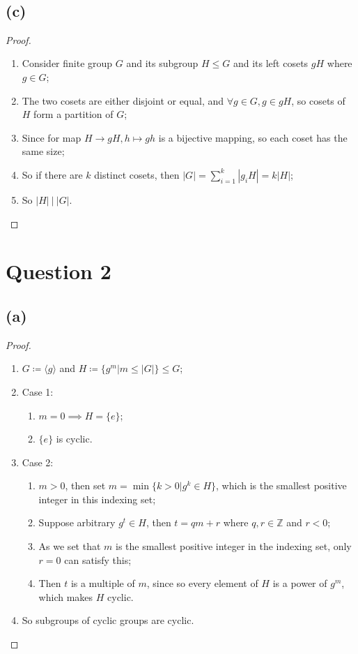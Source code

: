 \documentclass{article}
\begin{document}
~

\subsection*{(c)}

\begin{proof}
    ~
    \begin{enumerate}
        \item Consider finite group $G$ and its subgroup $H\leq G$ and its left cosets $gH$ where $g\in G$;
        \item The two cosets are either disjoint or equal, and $\forall g\in G, g\in gH$, so cosets of $H$ form a partition of $G$;
        \item Since for map $H\to gH,h\mapsto gh$ is a bijective mapping, so each coset has the same size;
        \item So if there are $k$ distinct cosets, then $|G|=\sum_{i=1}^{k}|g_iH|=k|H|$;
        \item So $|H|\  |\  |G|$.
    \end{enumerate}
\end{proof}

\newpage

\section*{Question 2}

\subsection*{(a)}

\begin{proof}
~
    \begin{enumerate}
        \item $G\coloneqq \langle g\rangle$ and $H \coloneqq \{g^m|m\leq |G|\}\leq G$;
        \item Case 1: 
        \begin{enumerate}
            \item $m=0 \implies H=\{e\}$;
            \item $\{e\}$ is cyclic.
        \end{enumerate}
        \item Case 2:
        \begin{enumerate}
            \item $m> 0$, then set $m=\min\{k>0|g^k\in H\}$, which is the smallest positive integer in this indexing set;
            \item Suppose arbitrary $g^t\in H$, then $t=qm+r$ where $q,r\in \mathbb{Z}$ and $r<0$;
            \item As we set that $m$ is the smallest positive integer in the indexing set, only $r=0$ can satisfy this;
            \item Then $t$ is a multiple of $m$, since so every element of $H$ is a power of $g^m$, which makes $H$ cyclic.
        \end{enumerate}
        \item So subgroups of cyclic groups are cyclic.
    \end{enumerate}
\end{proof}
\end{document}
